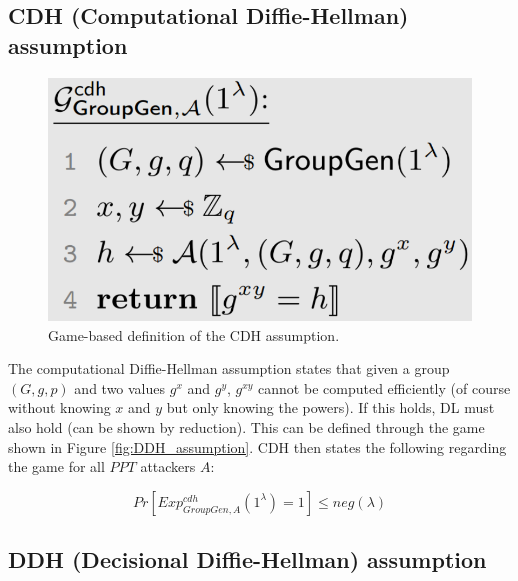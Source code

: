 \subsection{CDH (Computational Diffie-Hellman) assumption}

\begin{figure}
    \center
    \includegraphics[width=\linewidth]{gfx/CDH_assumption.png}
    \caption{Game-based definition of the CDH assumption.}
    \label{fig:CDH_assumption}
\end{figure}


The computational Diffie-Hellman assumption states that given a group $(G,g,p)$ and two values $g^x$ and $g^y$, $g^{xy}$ cannot be computed efficiently (of course without knowing $x$ and $y$ but only knowing the powers).
If this holds, DL must also hold (can be shown by reduction).
This can be defined through the game shown in Figure \ref{fig:DDH_assumption}.
CDH then states the following regarding the game for all $PPT$ attackers $A$:

$$
    Pr[Exp_{GroupGen,A}^{cdh}(1^\lambda) = 1] \leq neg(\lambda)
$$


\subsection{DDH (Decisional Diffie-Hellman) assumption}

